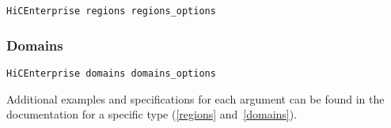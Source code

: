 \begin{lstlisting}
HiCEnterprise regions regions_options
\end{lstlisting}


\subsubsection{Domains}

\begin{lstlisting}
HiCEnterprise domains domains_options
\end{lstlisting}


Additional examples and specifications for each argument can be found in the documentation for a specific type
(\ref{regions} and~\ref{domains}).

